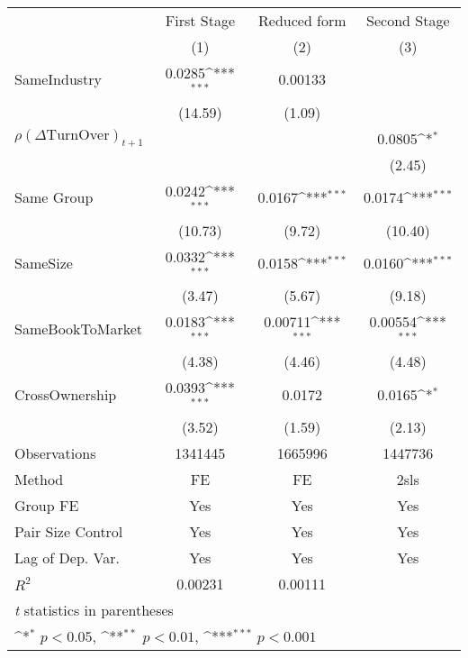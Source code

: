 {
\def\sym#1{\ifmmode^{#1}\else\(^{#1}\)\fi}
\begin{tabular}{l*{3}{c}}
\hline\hline
                    & First Stage         &Reduced form         &Second Stage         \\
                    &\multicolumn{1}{c}{(1)}         &\multicolumn{1}{c}{(2)}         &\multicolumn{1}{c}{(3)}         \\
\hline
SameIndustry        &      0.0285\sym{***}&     0.00133         &                     \\
                    &     (14.59)         &      (1.09)         &                     \\
[1em]
 $ {\rho(\Delta \text{TurnOver})_{t+1}} $ &                     &                     &      0.0805\sym{*}  \\
                    &                     &                     &      (2.45)         \\
[1em]
Same Group          &      0.0242\sym{***}&      0.0167\sym{***}&      0.0174\sym{***}\\
                    &     (10.73)         &      (9.72)         &     (10.40)         \\
[1em]
SameSize            &      0.0332\sym{***}&      0.0158\sym{***}&      0.0160\sym{***}\\
                    &      (3.47)         &      (5.67)         &      (9.18)         \\
[1em]
SameBookToMarket    &      0.0183\sym{***}&     0.00711\sym{***}&     0.00554\sym{***}\\
                    &      (4.38)         &      (4.46)         &      (4.48)         \\
[1em]
CrossOwnership      &      0.0393\sym{***}&      0.0172         &      0.0165\sym{*}  \\
                    &      (3.52)         &      (1.59)         &      (2.13)         \\
\hline
Observations        &     1341445         &     1665996         &     1447736         \\
Method              &          FE         &          FE         &        2sls         \\
Group FE            &         Yes         &         Yes         &         Yes         \\
Pair Size Control   &         Yes         &         Yes         &         Yes         \\
Lag of Dep. Var.    &         Yes         &         Yes         &         Yes         \\
$ R^2$              &     0.00231         &     0.00111         &                     \\
\hline\hline
\multicolumn{4}{l}{\footnotesize \textit{t} statistics in parentheses}\\
\multicolumn{4}{l}{\footnotesize \sym{*} \(p<0.05\), \sym{**} \(p<0.01\), \sym{***} \(p<0.001\)}\\
\end{tabular}
}
